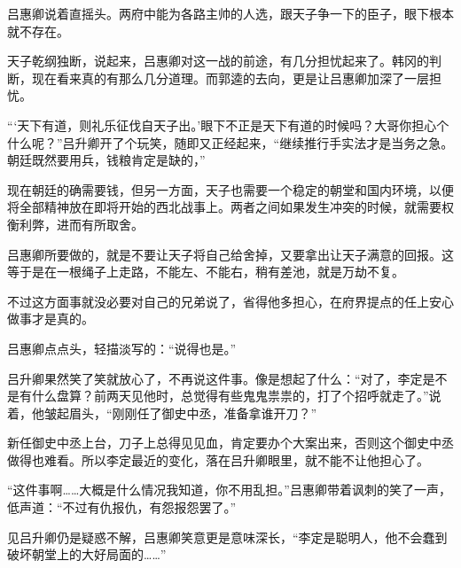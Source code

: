 吕惠卿说着直摇头。两府中能为各路主帅的人选，跟天子争一下的臣子，眼下根本就不存在。

天子乾纲独断，说起来，吕惠卿对这一战的前途，有几分担忧起来了。韩冈的判断，现在看来真的有那么几分道理。而郭逵的去向，更是让吕惠卿加深了一层担忧。

“‘天下有道，则礼乐征伐自天子出。’眼下不正是天下有道的时候吗？大哥你担心个什么呢？”吕升卿开了个玩笑，随即又正经起来，“继续推行手实法才是当务之急。朝廷既然要用兵，钱粮肯定是缺的，”

现在朝廷的确需要钱，但另一方面，天子也需要一个稳定的朝堂和国内环境，以便将全部精神放在即将开始的西北战事上。两者之间如果发生冲突的时候，就需要权衡利弊，进而有所取舍。

吕惠卿所要做的，就是不要让天子将自己给舍掉，又要拿出让天子满意的回报。这等于是在一根绳子上走路，不能左、不能右，稍有差池，就是万劫不复。

不过这方面事就没必要对自己的兄弟说了，省得他多担心，在府界提点的任上安心做事才是真的。

吕惠卿点点头，轻描淡写的：“说得也是。”

吕升卿果然笑了笑就放心了，不再说这件事。像是想起了什么：“对了，李定是不是有什么盘算？前两天见他时，总觉得有些鬼鬼祟祟的，打了个招呼就走了。”说着，他皱起眉头，“刚刚任了御史中丞，准备拿谁开刀？”

新任御史中丞上台，刀子上总得见见血，肯定要办个大案出来，否则这个御史中丞做得也难看。所以李定最近的变化，落在吕升卿眼里，就不能不让他担心了。

“这件事啊……大概是什么情况我知道，你不用乱担。”吕惠卿带着讽刺的笑了一声，低声道：“不过有仇报仇，有怨报怨罢了。”

见吕升卿仍是疑惑不解，吕惠卿笑意更是意味深长，“李定是聪明人，他不会蠢到破坏朝堂上的大好局面的……”

